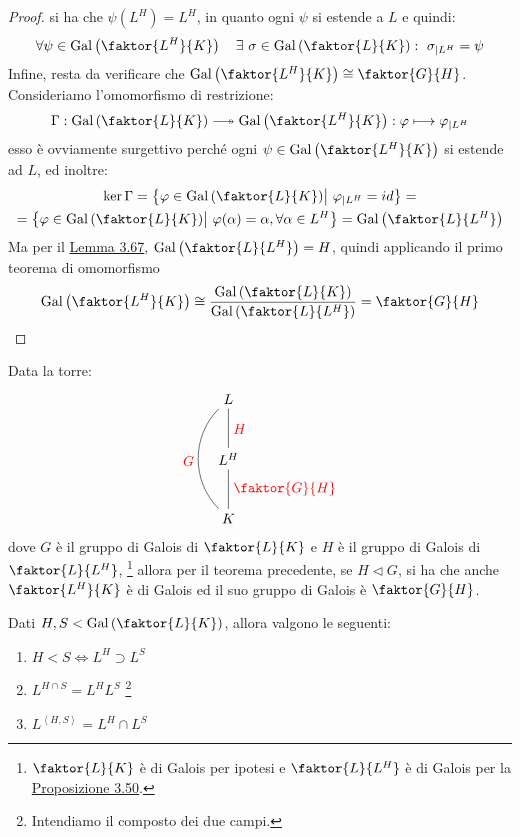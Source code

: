 \documentclass[11pt]{scrartcl}
\begin{document}
\begin{proof}
    si ha che $\psi(L^H) = L^H$, in quanto ogni $\psi$ si estende a $L$ e quindi:
    \[ \forall \psi \in \Gal\left(\faktor{L^H}{K}\right) \quad \exists~ \sigma \in \Gal\left(\faktor{L}{K}\right) :~ \sigma_{|L^H} = \psi
        \]
    Infine, resta da verificare che $\Gal\left(\faktor{L^H}{K}\right) \cong \faktor{G}{H}$. Consideriamo l'omomorfismo di restrizione:
    \[ \Gamma : \Gal\left(\faktor{L}{K}\right) \twoheadlongrightarrow \Gal\left(\faktor{L^H}{K}\right) : \varphi \longmapsto \varphi_{|L^H}
        \]
    esso è ovviamente surgettivo perché ogni $\psi \in \Gal\left(\faktor{L^H}{K}\right)$ si estende ad $L$, ed inoltre:
    \begin{multline*}
        \ker \Gamma = \left\{\varphi \in \Gal\left(\faktor{L}{K}\right) \m~ \varphi_{|L^H} = id \right\} = \\
	= \left\{\varphi \in \Gal\left(\faktor{L}{K}\right) \m~ \varphi(\alpha) = \alpha, \forall \alpha \in L^H\right\} = \Gal\left(\faktor{L}{L^H}\right)
    \end{multline*}
    Ma per il \hyperref[3.67]{Lemma 3.67}, $\Gal\left(\faktor{L}{L^H}\right) = H$, quindi applicando il primo teorema di omomorfismo
    \[ \Gal\left(\faktor{L^H}{K}\right) \cong \frac{\Gal\left(\faktor{L}{K}\right)}{\Gal\left(\faktor{L}{L^H}\right)} = \faktor{G}{H}
        \]
\end{proof}

\begin{remark}
    Data la torre:
    \[\begin{tikzpicture}
        \node (Q1) at (0,-1.5) {$K$};
        \node (Q3) at (0,0) {$L^H$};
        \node (Q4) at (0,1.5) {$L$};
        \draw (Q4)--(Q3) node [right, yshift=-0.75cm, red] {$\faktor{G}{H}$};
        \draw (Q1)--(Q3) node [right, yshift=0.75cm, red] {$H$};
        \draw(Q4) to [bend right=45] (Q1) node[left, yshift=1.20cm, xshift=-0.5cm, red] {$G$};
    \end{tikzpicture}
        \]
    dove $G$ è il gruppo di Galois di $\faktor{L}{K}$ e $H$ è il gruppo di Galois di $\faktor{L}{L^H}$,
    \footnote{$\faktor{L}{K}$ è di Galois per ipotesi e $\faktor{L}{L^H}$ è di Galois per la \hyperref[3.50]{Proposizione 3.50}.}
    allora per il teorema precedente, se $H \triangleleft G$, si ha che anche $\faktor{L^H}{K}$ è di Galois ed il suo gruppo di Galois è $\faktor{G}{H}$.
\end{remark}

\begin{proposition}
Dati $H,S < \Gal\left(\faktor{L}{K}\right)$, allora valgono le seguenti:
\begin{enumerate}[(1)]
    \item $H < S \iff L^H \supset L^S$
    \item $L^{H \cap S} = L^H L^S$ \footnote{Intendiamo il composto dei due campi.} 
    \item $L^{\left<H,S\right>} = L^H \cap L^S$
\end{enumerate}
\end{proposition}
\end{document}
